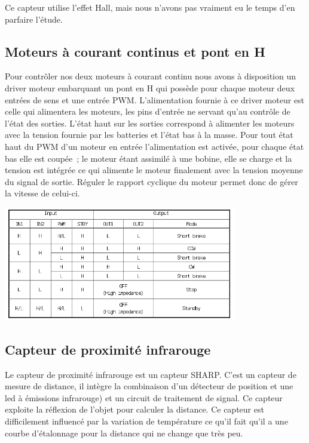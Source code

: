 \documentclass{article}
\begin{document}
Ce capteur utilise l'effet Hall, mais nous n'avons pas vraiment eu le temps d'en parfaire l'étude.

\subsection{Moteurs à courant continus et pont en H}

Pour contrôler nos deux moteurs à courant continu nous avons à disposition un driver moteur embarquant un pont en H qui possède pour chaque moteur deux entrées de sens et une entrée PWM. L'alimentation fournie à ce driver moteur est celle qui alimentera les moteurs, les pins d'entrée ne servant qu'au contrôle de l'état des sorties. L'état haut sur les sorties correspond à alimenter les moteurs avec la tension fournie par les batteries et l'état bas à la masse. Pour tout état haut du PWM d'un moteur en entrée l'alimentation est activée, pour chaque état bas elle est coupée~; le moteur étant assimilé à une bobine, elle se charge et la tension est intégrée ce qui alimente le moteur finalement avec la tension moyenne du signal de sortie. Réguler le rapport cyclique du moteur permet donc de gérer la vitesse de celui-ci.

\begin{center}
  \includegraphics[height=5cm]{driver.png}
\end{center}

\subsection{Capteur de proximité infrarouge}

Le capteur de proximité infrarouge est un capteur SHARP. C'est un capteur de mesure de distance, il intègre la combinaison d'un détecteur de position et une led à émissions infrarouge) et un circuit de traitement de signal. Ce capteur exploite la réflexion de l'objet pour calculer la distance. Ce capteur est difficilement influencé par la variation de température ce qu'il fait qu'il a une courbe d'étalonnage pour la distance qui ne change que très peu.
\end{document}
